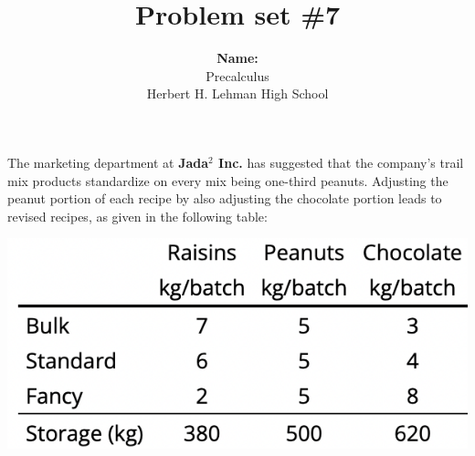 \documentclass{exam}
\title{Problem set \#7}
\author{ \textbf{Name: }  \enspace\hrulefill \\ Precalculus \\ Herbert H. Lehman High School }
\begin{document}
\maketitle
\thispagestyle{empty}


\noindent The marketing department at \textbf{Jada$^2$ Inc.}  has suggested that the company's trail mix products standardize on every mix being one-third peanuts. Adjusting the peanut portion of each recipe by also adjusting the chocolate portion leads to revised recipes,  as given in the following table:


\includegraphics[scale=0.5]{table.png}
\end{document}
